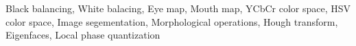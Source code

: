 Black balancing,  White balacing, Eye map, Mouth map, YCbCr color space, HSV color space,  
Image segementation, Morphological operations, Hough transform, Eigenfaces, Local phase quantization 